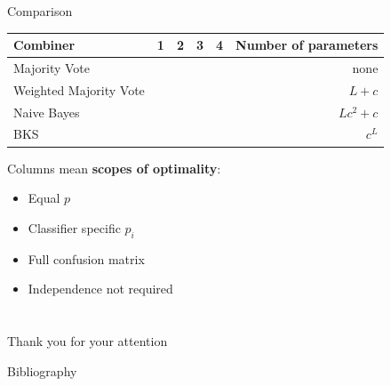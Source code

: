 \documentclass[xcolor=table]{beamer}
\begin{document}
\begin{frame}{Comparison}
\begin{table}[]
\begin{tabular}{l|llllr}
Combiner               & 1                                               & 2                                               & 3                                               & 4                        & Number of parameters \\ \hline
Majority Vote          & \cellcolor[HTML]{000000}{\color[HTML]{000000} } &                                                 &                                                 &                          & none                 \\
Weighted Majority Vote & \cellcolor[HTML]{000000}{\color[HTML]{000000} } & \cellcolor[HTML]{000000}                        &                                                 &                          & $L+c$                \\
Naive Bayes            & \cellcolor[HTML]{000000}{\color[HTML]{000000} } & \cellcolor[HTML]{000000}{\color[HTML]{000000} } & \cellcolor[HTML]{000000}{\color[HTML]{000000} } &                          & $Lc^2 + c$           \\
BKS                    & \cellcolor[HTML]{000000}                        & \cellcolor[HTML]{000000}                        & \cellcolor[HTML]{000000}                        & \cellcolor[HTML]{000000} & $c^L$               
\end{tabular}
\end{table}
Columns mean \textbf{scopes of optimality}:
\begin{itemize}
    \item Equal \(p\)
    \item Classifier specific \(p_i\)
    \item Full confusion matrix
    \item Independence not required
\end{itemize}
\end{frame}

\section*{}

\begin{frame}{}
    \begin{center}
        Thank you for your attention
    \end{center}
\end{frame}




  \begin{frame}[noframenumbering]{Bibliography}

  
  

  \end{frame}
\end{document}

